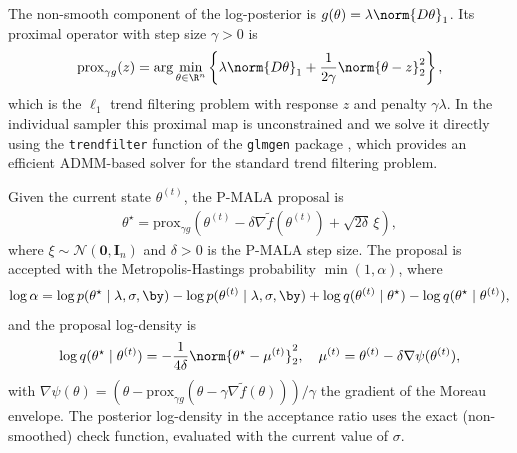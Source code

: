 The non-smooth component of the log-posterior is $g(\theta) = \lambda \norm{D\theta}_1$. Its proximal operator with step size $\gamma > 0$ is
\begin{align*}
    \mathrm{prox}_{\gamma g}(z)
    = \arg\min_{\theta \in \R^n}
    \left\{\lambda \norm{D\theta}_1
    + \frac{1}{2\gamma}\norm{\theta - z}_2^2\right\},
\end{align*}
which is the $\ell_1$ trend filtering problem with response $z$ and penalty $\gamma\lambda$. In the individual sampler this proximal map is unconstrained and we solve it directly using the \texttt{trendfilter} function of the \texttt{glmgen} package \citep{tibshirani2014adaptive}, which provides an efficient ADMM-based solver for the standard trend filtering problem.

Given the current state $\theta^{(t)}$, the P-MALA proposal is
\begin{align*}
    \theta^\star
    = \mathrm{prox}_{\gamma g}\!\left(
    \theta^{(t)} - \delta \nabla \tilde{f}(\theta^{(t)})
    + \sqrt{2\delta}\,\xi
    \right),
\end{align*}
where $\xi \sim \mathcal{N}(\mathbf{0}, \mathbf{I}_n)$ and $\delta > 0$ is the P-MALA step size. The proposal is accepted with the Metropolis-Hastings probability $\min(1, \alpha)$, where
\begin{align*}
    \log \alpha = \log p(\theta^\star \mid \lambda, \sigma, \by)
    - \log p(\theta^{(t)} \mid \lambda, \sigma, \by)
    + \log q(\theta^{(t)} \mid \theta^\star)
    - \log q(\theta^\star \mid \theta^{(t)}),
\end{align*}
and the proposal log-density is
\begin{align*}
    \log q(\theta^\star \mid \theta^{(t)})
    = -\frac{1}{4\delta}
    \norm{\theta^\star - \mu^{(t)}}_2^2, \quad
    \mu^{(t)} = \theta^{(t)}
    - \delta \nabla \psi(\theta^{(t)}),
\end{align*}
with $\nabla \psi(\theta) = (\theta - \mathrm{prox}_{\gamma g}(\theta - \gamma \nabla \tilde{f}(\theta)))/\gamma$ the gradient of the Moreau envelope. The posterior log-density in the acceptance ratio uses the exact (non-smoothed) check function, evaluated with the current value of $\sigma$.

